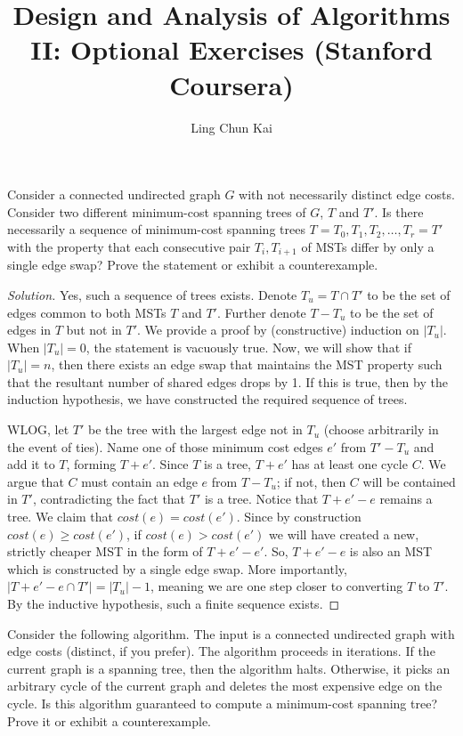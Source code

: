 \documentclass[10pt]{article}
\newenvironment{problem}[2][Problem]{\begin{trivlist}
\item[\hskip \labelsep {\bfseries #1}\hskip \labelsep {\bfseries #2.}]}{\end{trivlist}}
\begin{document}
 
\title{Design and Analysis of Algorithms II: Optional Exercises (Stanford Coursera)}
\author{Ling Chun Kai}
\maketitle
 
\begin{problem}{1}
Consider a connected undirected graph $G$ with not necessarily distinct edge costs. Consider two different minimum-cost spanning trees of $G$, $T$ and $T′$. Is there necessarily a sequence of minimum-cost spanning trees $T=T_0,T_1,T_2,…,T_r=T′$ with the property that each consecutive pair $T_i,T_{i+1}$ of MSTs differ by only a single edge swap? Prove the statement or exhibit a counterexample.
\end{problem}

\begin{proof}[Solution]
Yes, such a sequence of trees exists. Denote $T_u = T \cap T'$ to be the set of edges common to both MSTs $T$ and $T'$. Further denote $T-T_u$ to be the set of edges in $T$ but not in $T'$. We provide a proof by (constructive) induction on $|T_u|$. When $|T_u|=0$, the statement is vacuously true. Now, we will show that if $|T_u|=n$, then there exists an edge swap that maintains the MST property such that the resultant number of shared edges drops by 1. If this is true, then by the induction hypothesis, we have constructed the required sequence of trees.

WLOG, let $T'$ be the tree with the largest edge not in $T_u$ (choose arbitrarily in the event of ties). Name one of those minimum cost edges $e'$ from $T'-T_u$ and add it to $T$, forming $T+e'$. Since $T$ is a tree, $T+e'$ has at least one cycle $C$. We argue that $C$ must contain an edge $e$ from $T-T_u$; if not, then $C$ will be contained in $T'$, contradicting the fact that $T'$ is a tree. Notice that $T+e'-e$ remains a tree. We claim that $cost(e)=cost(e')$. Since by construction $cost(e) \ge cost(e')$, if $cost(e) > cost(e')$ we will have created a new, strictly cheaper MST in the form of $T+e'-e'$. So, $T+e'-e$ is also an MST which is constructed by a single edge swap. More importantly, $|T+e'-e \cap T'|=|T_u|-1$, meaning we are one step closer to converting $T$ to $T'$. By the inductive hypothesis, such a finite sequence exists.

\end{proof}

\begin{problem}{2}
Consider the following algorithm. The input is a connected undirected graph with edge costs (distinct, if you prefer). The algorithm proceeds in iterations. If the current graph is a spanning tree, then the algorithm halts. Otherwise, it picks an arbitrary cycle of the current graph and deletes the most expensive edge on the cycle. Is this algorithm guaranteed to compute a minimum-cost spanning tree? Prove it or exhibit a counterexample.
\end{problem}
\end{document}
